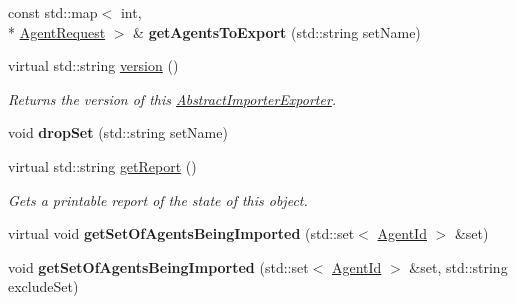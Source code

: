 \begin{DoxyCompactItemize}
\item 
\hypertarget{classrepast_1_1_importer_exporter___b_y___s_e_t_a47875477bcfa1417bd94c500708ca8ac}{const std\-::map$<$ int, \\*
\hyperlink{classrepast_1_1_agent_request}{Agent\-Request} $>$ \& {\bfseries get\-Agents\-To\-Export} (std\-::string set\-Name)}\label{classrepast_1_1_importer_exporter___b_y___s_e_t_a47875477bcfa1417bd94c500708ca8ac}

\item 
virtual std\-::string \hyperlink{classrepast_1_1_importer_exporter___b_y___s_e_t_a440dc78901d8811ba6046d769df298d9}{version} ()
\begin{DoxyCompactList}\small\item\em Returns the version of this \hyperlink{classrepast_1_1_abstract_importer_exporter}{Abstract\-Importer\-Exporter}. \end{DoxyCompactList}\item 
\hypertarget{classrepast_1_1_importer_exporter___b_y___s_e_t_ab1c9657eb2842f25530dbb5dc932739c}{void {\bfseries drop\-Set} (std\-::string set\-Name)}\label{classrepast_1_1_importer_exporter___b_y___s_e_t_ab1c9657eb2842f25530dbb5dc932739c}

\item 
\hypertarget{classrepast_1_1_importer_exporter___b_y___s_e_t_a02c13955439cefc10f024f36c5d0a74f}{virtual std\-::string \hyperlink{classrepast_1_1_importer_exporter___b_y___s_e_t_a02c13955439cefc10f024f36c5d0a74f}{get\-Report} ()}\label{classrepast_1_1_importer_exporter___b_y___s_e_t_a02c13955439cefc10f024f36c5d0a74f}

\begin{DoxyCompactList}\small\item\em Gets a printable report of the state of this object. \end{DoxyCompactList}\item 
\hypertarget{classrepast_1_1_importer_exporter___b_y___s_e_t_a8037129cdc08cbbea56c4a680afa1059}{virtual void {\bfseries get\-Set\-Of\-Agents\-Being\-Imported} (std\-::set$<$ \hyperlink{classrepast_1_1_agent_id}{Agent\-Id} $>$ \&set)}\label{classrepast_1_1_importer_exporter___b_y___s_e_t_a8037129cdc08cbbea56c4a680afa1059}

\item 
\hypertarget{classrepast_1_1_importer_exporter___b_y___s_e_t_a586fb335673c8a4ec6f9fd9852b209a8}{void {\bfseries get\-Set\-Of\-Agents\-Being\-Imported} (std\-::set$<$ \hyperlink{classrepast_1_1_agent_id}{Agent\-Id} $>$ \&set, std\-::string exclude\-Set)}\label{classrepast_1_1_importer_exporter___b_y___s_e_t_a586fb335673c8a4ec6f9fd9852b209a8}


\end{DoxyCompactItemize}
